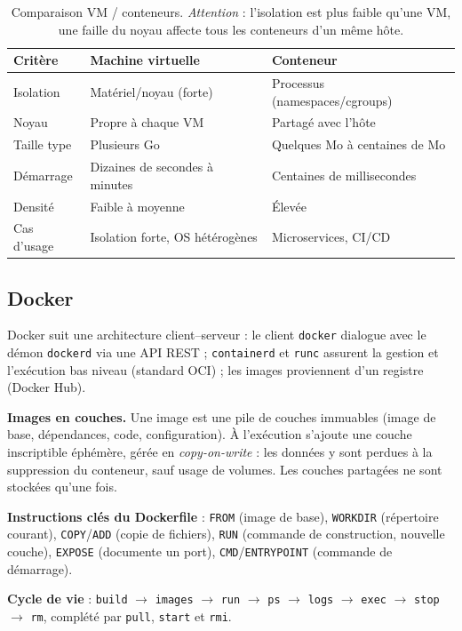 \documentclass[11pt,a4paper]{article}
\begin{document}
\begin{table}[h]\centering\small
\begin{tabular}{@{}lll@{}}
\toprule
\textbf{Critère} & \textbf{Machine virtuelle} & \textbf{Conteneur}\\
\midrule
Isolation & Matériel/noyau (forte) & Processus (namespaces/cgroups)\\
Noyau & Propre à chaque VM & Partagé avec l'hôte\\
Taille type & Plusieurs Go & Quelques Mo à centaines de Mo\\
Démarrage & Dizaines de secondes à minutes & Centaines de millisecondes\\
Densité & Faible à moyenne & Élevée\\
Cas d'usage & Isolation forte, OS hétérogènes & Microservices, CI/CD\\
\bottomrule
\end{tabular}
\caption{Comparaison VM / conteneurs. \textit{Attention} : l'isolation est plus faible qu'une VM, une faille du noyau affecte tous les conteneurs d'un même hôte.}
\end{table}

\subsection{Docker}
Docker suit une architecture client--serveur : le client \texttt{docker} dialogue avec le démon
\texttt{dockerd} via une API REST ; \texttt{containerd} et \texttt{runc} assurent la gestion et
l'exécution bas niveau (standard OCI) ; les images proviennent d'un registre (Docker Hub).

\textbf{Images en couches.} Une image est une pile de couches immuables (image de base, dépendances,
code, configuration). À l'exécution s'ajoute une couche inscriptible éphémère, gérée en
\emph{copy-on-write} : les données y sont perdues à la suppression du conteneur, sauf usage de volumes.
Les couches partagées ne sont stockées qu'une fois.

\textbf{Instructions clés du Dockerfile} : \texttt{FROM} (image de base), \texttt{WORKDIR} (répertoire
courant), \texttt{COPY}/\texttt{ADD} (copie de fichiers), \texttt{RUN} (commande de construction, nouvelle
couche), \texttt{EXPOSE} (documente un port), \texttt{CMD}/\texttt{ENTRYPOINT} (commande de démarrage).

\textbf{Cycle de vie} : \texttt{build} $\rightarrow$ \texttt{images} $\rightarrow$ \texttt{run}
$\rightarrow$ \texttt{ps} $\rightarrow$ \texttt{logs} $\rightarrow$ \texttt{exec} $\rightarrow$
\texttt{stop} $\rightarrow$ \texttt{rm}, complété par \texttt{pull}, \texttt{start} et \texttt{rmi}.
\end{document}
